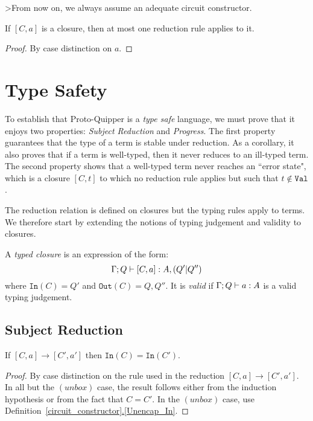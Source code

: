 \documentclass{article}
\begin{document}
>From now on, we always assume an adequate circuit constructor.

\begin{proposition}
\label{determinicity}
If $[C,a]$ is a closure, then at most one reduction rule applies
to it.
\end{proposition}

\begin{proof}
By case distinction on $a$.
\end{proof}


\section{Type Safety}

To establish that Proto-Quipper is a \emph{type safe} language, we must prove that 
it enjoys two properties: \emph{Subject Reduction} and \emph{Progress}. The first 
property guarantees that the type of a term is stable under reduction. As a 
corollary, it also proves that if a term is well-typed, then it never reduces to 
an ill-typed term. The second property shows that a well-typed term never reaches 
an ``error state", which is a closure $[C,t]$ to which no reduction rule applies 
but such that $t\notin \mathtt{Val}$. 

The reduction relation is defined on closures but the typing rules apply to terms. 
We therefore start by extending the notions of typing judgement and validity to 
closures.

\begin{definition}
A \emph{typed closure} is an expression of the form:
\[
\Gamma;Q\vdash [C,a]:A,(Q'|Q'')
\]
where $\mathtt{In}(C)=Q'$ and $\mathtt{Out}(C)=Q,Q''$. It is 
\emph{valid} if $\Gamma;Q\vdash a:A$ is a valid 
typing judgement.
\end{definition}

\subsection{Subject Reduction}

\begin{lemma}
\label{Inwires}
If $[C,a]\to[C',a']$ then $\mathtt{In}(C)=\mathtt{In}(C')$.
\end{lemma}

\begin{proof}
By case distinction on the rule used in the reduction $[C,a]\to[C',a']$. 
In all but the $(unbox)$ case, the result follows either from the induction 
hypothesis or from the fact that $C=C'$. In the $(unbox)$ case, use 
Definition~\hyperref[Unencap_In]{\ref*{circuit_constructor}.\ref*{Unencap_In}}.
\end{proof}
\end{document}
